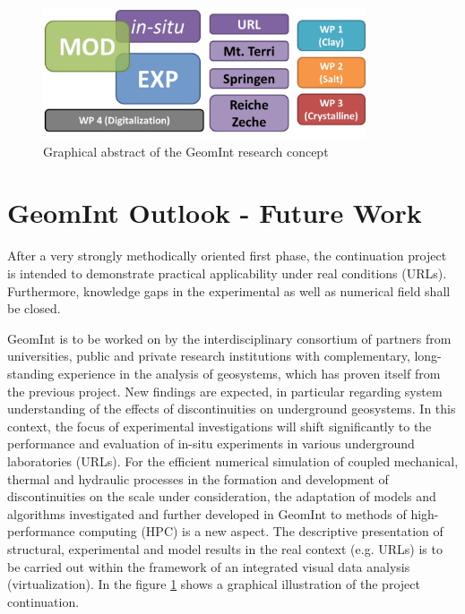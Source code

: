 \clearpage

\begin{figure}[ht!]
\centering
\includegraphics[width=0.85\textwidth]{figures/geomint2.png}
\caption{Graphical abstract of the GeomInt research concept}
\label{fig:geomint2}
\end{figure}

\section{GeomInt Outlook - Future Work}

After a very strongly methodically oriented first phase, the continuation project is intended to demonstrate practical applicability under real conditions (URLs). Furthermore, knowledge gaps in the experimental as well as numerical field shall be closed.

GeomInt is to be worked on by the interdisciplinary consortium of partners from universities, public and private research institutions with complementary, long-standing experience in the analysis of geosystems, which has proven itself from the previous project. New findings are expected, in particular regarding system understanding of the effects of discontinuities on underground geosystems. In this context, the focus of experimental investigations will shift significantly to the performance and evaluation of in-situ experiments in various underground laboratories (URLs). For the efficient numerical simulation of coupled mechanical, thermal and hydraulic processes in the formation and development of discontinuities on the scale under consideration, the adaptation of models and algorithms investigated and further developed in GeomInt to methods of high-performance computing (HPC) is a new aspect. The descriptive presentation of structural, experimental and model results in the real context (e.g. URLs) is to be carried out within the framework of an integrated visual data analysis (virtualization).
In the figure \ref{fig:geomint2} shows a graphical illustration of the project continuation.

